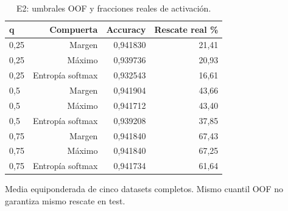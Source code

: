 \begin{table}[!htbp]\centering
\fontsize{8}{10}\selectfont\setlength{\tabcolsep}{4pt}
\caption{E2: umbrales OOF y fracciones reales de activación.}\label{tab:e2-confidence-readable}
\begin{tabular}{@{}lrrr@{}}\toprule
q & Compuerta & Accuracy & Rescate real \%\\\midrule
0,25 & Margen & 0,941830 & 21,41\\
0,25 & Máximo & 0,939736 & 20,93\\
0,25 & Entropía softmax & 0,932543 & 16,61\\
0,5 & Margen & 0,941904 & 43,66\\
0,5 & Máximo & 0,941712 & 43,40\\
0,5 & Entropía softmax & 0,939208 & 37,85\\
0,75 & Margen & 0,941840 & 67,43\\
0,75 & Máximo & 0,941840 & 67,25\\
0,75 & Entropía softmax & 0,941734 & 61,64\\
\bottomrule\end{tabular}
\par\smallskip\begin{minipage}{0.98\textwidth}\footnotesize Media equiponderada de cinco datasets completos. Mismo cuantil OOF no garantiza mismo rescate en test.\end{minipage}
\end{table}
